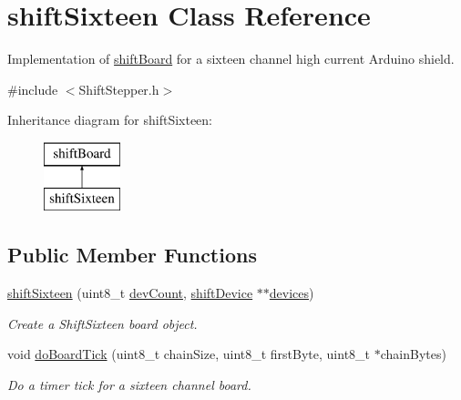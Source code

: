 \hypertarget{classshift_sixteen}{
\section{shiftSixteen Class Reference}
\label{classshift_sixteen}
}


Implementation of \hyperlink{classshift_board}{shiftBoard} for a sixteen channel high current Arduino shield.  




{\ttfamily \#include $<$ShiftStepper.h$>$}

Inheritance diagram for shiftSixteen:\begin{figure}[H]
\begin{center}
\leavevmode
\includegraphics[height=2.000000cm]{classshift_sixteen}
\end{center}
\end{figure}
\subsection*{Public Member Functions}
\begin{DoxyCompactItemize}
\item 
\hyperlink{classshift_sixteen_afb8981ea1869387ca6e5b4c2a28b8018}{shiftSixteen} (uint8\_\-t \hyperlink{classshift_board_ae7bba07850ced1219dcf67cab33de929}{devCount}, \hyperlink{classshift_device}{shiftDevice} $\ast$$\ast$\hyperlink{classshift_board_a07a2549714f7064fa5e48ec63fdb5efb}{devices})
\begin{DoxyCompactList}\small\item\em Create a ShiftSixteen board object. \item\end{DoxyCompactList}\item 
void \hyperlink{classshift_sixteen_a28c2a73078d10abf6f779021fd8d2908}{doBoardTick} (uint8\_\-t chainSize, uint8\_\-t firstByte, uint8\_\-t $\ast$chainBytes)
\begin{DoxyCompactList}\small\item\em Do a timer tick for a sixteen channel board. \item\end{DoxyCompactList}\end{DoxyCompactItemize}


